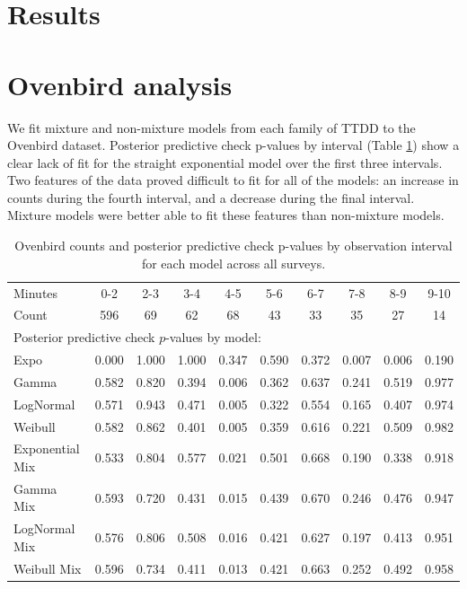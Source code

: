 \documentclass[useAMS,usenatbib,referee,12pt]{article}
\begin{document}
\section{Results}\label{sec:results}

\section{Ovenbird analysis}

We fit mixture and non-mixture models from each family of TTDD to the Ovenbird dataset.  
Posterior predictive check p-values by interval (Table \ref{tbl:ovencounts}) show a clear lack of fit for the straight exponential model over the first three intervals.  
Two features of the data proved difficult to fit for all of the models: an increase in counts during the fourth interval, and a decrease during the final interval.  
Mixture models were better able to fit these features than non-mixture models.

\begin{table}[ht]
\centering
\begin{tabular}{lccccccccc}
  \hline
Minutes & 0-2 & 2-3 & 3-4 & 4-5 & 5-6 & 6-7 & 7-8 & 8-9 & 9-10 \\ 
Count & 596 & 69 & 62 & 68 & 43 & 33 & 35 & 27 & 14 \\ 
\hline
\multicolumn{10}{l}{Posterior predictive check $p$-values by model:}\\
\hline
Expo & 0.000 & 1.000 & 1.000 & 0.347 & 0.590 & 0.372 & 0.007 & 0.006 & 0.190 \\ 
  Gamma & 0.582 & 0.820 & 0.394 & 0.006 & 0.362 & 0.637 & 0.241 & 0.519 & 0.977 \\ 
  LogNormal & 0.571 & 0.943 & 0.471 & 0.005 & 0.322 & 0.554 & 0.165 & 0.407 & 0.974 \\ 
  Weibull & 0.582 & 0.862 & 0.401 & 0.005 & 0.359 & 0.616 & 0.221 & 0.509 & 0.982 \\ 
  Exponential Mix & 0.533 & 0.804 & 0.577 & 0.021 & 0.501 & 0.668 & 0.190 & 0.338 & 0.918 \\ 
  Gamma Mix & 0.593 & 0.720 & 0.431 & 0.015 & 0.439 & 0.670 & 0.246 & 0.476 & 0.947 \\ 
  LogNormal Mix & 0.576 & 0.806 & 0.508 & 0.016 & 0.421 & 0.627 & 0.197 & 0.413 & 0.951 \\ 
  Weibull Mix & 0.596 & 0.734 & 0.411 & 0.013 & 0.421 & 0.663 & 0.252 & 0.492 & 0.958 \\ 
   \hline
\end{tabular}
\caption{\label{tbl:ovencounts} Ovenbird counts and posterior predictive check p-values by observation interval for each model across all surveys.}
\end{table}
\end{document}
